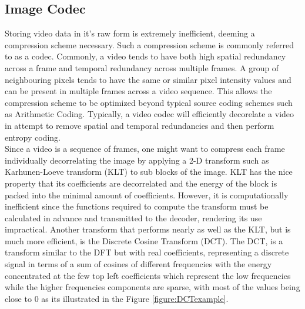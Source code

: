 \documentclass[a4paper,11pt,oneside]{article}
\begin{document}
\subsection{Image Codec}
\indent Storing video data in it's raw form is extremely inefficient, deeming a compression scheme necessary. Such a compression scheme is commonly referred to as a codec. 
Commonly, a video tends to have both high spatial redundancy across a frame and temporal redundancy across multiple frames. A group of neighbouring pixels tends to have the same or similar pixel intensity values and can be present in multiple frames across a video sequence. This allows the compression scheme to be optimized beyond typical source coding schemes such as Arithmetic Coding. Typically, a video codec will efficiently decorelate a video in attempt to remove spatial and temporal redundancies and then perform entropy coding.\\
\indent %
Since a video is a sequence of frames, one might want to compress each frame individually decorrelating the image by applying a 2-D transform such as Karhunen-Loeve transform (KLT) to sub blocks of the image. KLT has the nice property that its coefficients are decorrelated and the energy of the block is packed into the minimal amount of coefficients. However, it is computationally inefficient since the functions required to compute the transform must be calculated in advance and transmitted to the decoder, rendering its use impractical. Another transform that performs nearly as well as the KLT, but is much more efficient, is the Discrete Cosine Transform (DCT). The DCT, is a transform similar to the DFT but with real
coefficients, representing a discrete signal in terms of a sum of cosines of different frequencies with the energy concentrated at the few top left coefficients which represent the low frequencies while the higher frequencies components are sparse, with most of the values being close to $0$ as its illustrated in the Figure \ref{figure:DCTexample}.
\end{document}
